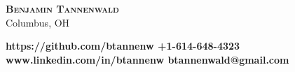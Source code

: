 \documentclass[line]{letter}
\begin{document}
\sffamily
{ \begin{center}\huge \textsc{\textbf{Benjamin Tannenwald}} \\\vspace{1mm}\fontsize{12}{13}\selectfont \sc Columbus, OH\end{center}}%
\vspace{-4mm}
{\bf \normalsize https://github.com/btannenw \hfill +1-614-648-4323\\} 
{\bf \normalsize www.linkedin.com/in/btannenw \hfill btannenwald@gmail.com\vspace*{-.15in}}

\noindent{\rule{\textwidth}{1.5pt}}

\end{document}
